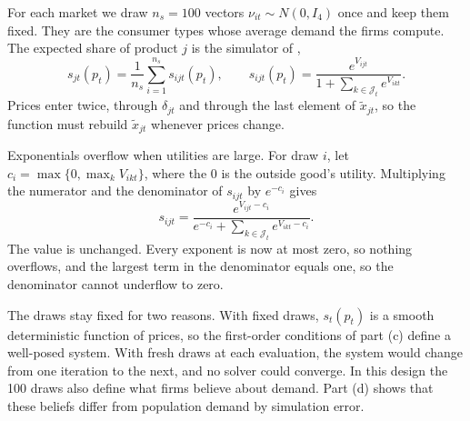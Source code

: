 For each market we draw $n_s = 100$ vectors $\nu_{it} \sim N(0, I_4)$ once and keep them fixed. They are the consumer
types whose average demand the firms compute. The expected share of product $j$ is the simulator of
\citet[eq.~11, p.~532]{Nevo2000a},
\begin{equation}\label{eq:C-rc-simshare}
  s_{jt}(p_t) = \frac{1}{n_s}\sum_{i=1}^{n_s}s_{ijt}(p_t) , \qquad
  s_{ijt}(p_t) = \frac{e^{V_{ijt}}}{1 + \sum_{k \in \mathcal{J}_t}e^{V_{ikt}}} .
\end{equation}
Prices enter twice, through $\delta_{jt}$ and through the last element of $\tilde x_{jt}$, so the function must rebuild
$\tilde x_{jt}$ whenever prices change.

Exponentials overflow when utilities are large. For draw $i$, let $c_i = \max\{0, \max_kV_{ikt}\}$, where the 0 is the
outside good's utility. Multiplying the numerator and the denominator of $s_{ijt}$ by $e^{-c_i}$ gives
\begin{equation*}
  s_{ijt} = \frac{e^{V_{ijt} - c_i}}{e^{-c_i} + \sum_{k \in \mathcal{J}_t}e^{V_{ikt} - c_i}} .
\end{equation*}
The value is unchanged. Every exponent is now at most zero, so nothing overflows, and the largest term in the
denominator equals one, so the denominator cannot underflow to zero.

The draws stay fixed for two reasons. With fixed draws, $s_t(p_t)$ is a smooth deterministic function of prices, so the
first-order conditions of part (c) define a well-posed system. With fresh draws at each evaluation, the system would
change from one iteration to the next, and no solver could converge. In this design the 100 draws also define what
firms believe about demand. Part (d) shows that these beliefs differ from population demand by simulation error.

